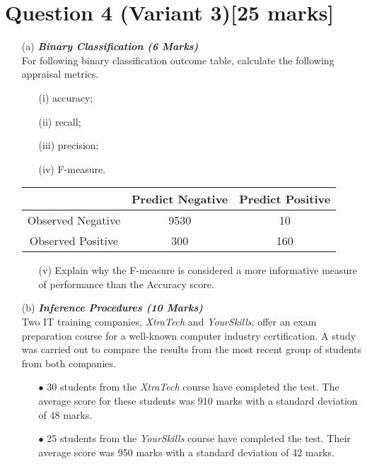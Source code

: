 \documentclass[]{article}
\begin{document}
\section*{Question 4 (Variant 3)[25 marks]}


\begin{itemize}
\item[(a)] \textbf{\textit{Binary Classification (6 Marks)}}\\
For following binary classification outcome table, calculate the following appraisal metrics.
\begin{itemize}
\item[(i)] accuracy;
\item[(ii)] recall;
\item[(iii)] precision;
\item[(iv)] F-measure.
\end{itemize}

\begin{center}
\begin{tabular}{|c|c|c|}
\hline  & \phantom{spa}Predict Negative\phantom{spa} & \phantom{spa}Predict Positive\phantom{spa} \\ 
\hline\phantom{spa} Observed Negative \phantom{spa}&9530&10\\ 
\hline \phantom{spa}Observed Positive\phantom{spa} & 300&160\\ 
\hline 
\end{tabular} 
\end{center}

\begin{itemize}
\item[(v)]  Explain why the F-measure is considered a more informative measure of performance than the Accuracy score.

\end{itemize}
\item[(b)] \textbf{\textit{Inference Procedures (10 Marks)}}\\
Two IT training companies, \textit{XtraTech} and \textit{YourSkills}, offer an exam preparation course for a well-known computer industry certification. A study was carried out to compare the results from the most recent group of students from both companies.
\begin{itemize}
\item[$\bullet$]30 students from the \textit{XtraTech} course have completed the test. The average score for these students was 910 marks with a standard deviation of 48 marks.

\item[$\bullet$]25 students from the \textit{YourSkills} course have completed the test. Their average score was 950 marks with a standard deviation of 42 marks.
\end{itemize}


\end{itemize}
\end{document}
